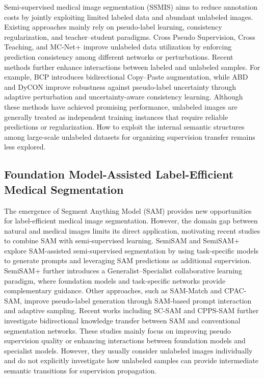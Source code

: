 \documentclass[a4paper,fleqn]{cas-dc}
\begin{document}
Semi-supervised medical image segmentation (SSMIS) aims to reduce annotation costs by jointly exploiting limited labeled data and abundant unlabeled images. Existing approaches mainly rely on pseudo-label learning, consistency regularization, and teacher--student paradigms. Cross Pseudo Supervision, Cross Teaching, and MC-Net+ improve unlabeled data utilization by enforcing prediction consistency among different networks or perturbations. Recent methods further enhance interactions between labeled and unlabeled samples. For example, BCP introduces bidirectional Copy--Paste augmentation, while ABD and DyCON improve robustness against pseudo-label uncertainty through adaptive perturbation and uncertainty-aware consistency learning.
Although these methods have achieved promising performance, unlabeled images are generally treated as independent training instances that require reliable predictions or regularization. How to exploit the internal semantic structures among large-scale unlabeled datasets for organizing supervision transfer remains less explored.


\subsection{Foundation Model-Assisted Label-Efficient Medical Segmentation}

The emergence of Segment Anything Model (SAM) provides new opportunities for label-efficient medical image segmentation. However, the domain gap between natural and medical images limits its direct application, motivating recent studies to combine SAM with semi-supervised learning.
SemiSAM and SemiSAM+ explore SAM-assisted semi-supervised segmentation by using task-specific models to generate prompts and leveraging SAM predictions as additional supervision. SemiSAM+ further introduces a Generalist--Specialist collaborative learning paradigm, where foundation models and task-specific networks provide complementary guidance. Other approaches, such as SAM-Match and CPAC-SAM, improve pseudo-label generation through SAM-based prompt interaction and adaptive sampling. Recent works including SC-SAM and CPPS-SAM further investigate bidirectional knowledge transfer between SAM and conventional segmentation networks.
These studies mainly focus on improving pseudo supervision quality or enhancing interactions between foundation models and specialist models. However, they usually consider unlabeled images individually and do not explicitly investigate how unlabeled samples can provide intermediate semantic transitions for supervision propagation.
\end{document}
